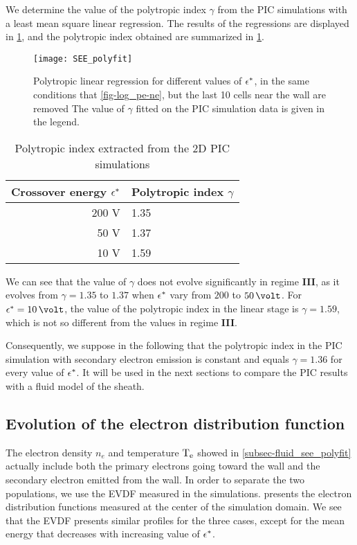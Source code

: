 We determine the value of the polytropic index $\gamma$ from the \ac{PIC} simulations with a least mean square linear regression.
The results of the regressions are displayed in \cref{fig-polyfit_see}, and the polytropic index obtained are summarized in \cref{tab-summarygamma}.


\begin{figure}[!htb]
  \centering
  \texttt{[image: SEE\_polyfit]}
  \caption{Polytropic linear regression for different values of $\epsilon^{*}$, in the same conditions that \cref{fig-log_pe-ne}, but the last 10 cells near the wall are removed The value of $\gamma$ fitted on the \acs{PIC} simulation data is given in the legend.}
  \label{fig-polyfit_see}
\end{figure}

\begin{table}[!htb]
  \centering
  \caption{Polytropic index extracted from the \acs{2D}  \acs{PIC} simulations}
  \label{tab-summarygamma}
  \begin{tabular}{@{}r l@{}} \toprule
  Crossover energy $\epsilon^{*}$ & Polytropic index $\gamma$ \\ \midrule
  200 V & 1.35 \\
  50 V & 1.37 \\
  10 V & 1.59 \\
  \bottomrule
  \end{tabular}
\end{table}


We can see that the value of $\gamma$ does not evolve significantly in regime {\bf III}, as it evolves from $\gamma=1.35$  to $1.37$ when $\epsilon^{*}$ vary from $200$ to $50\,\volt$.
For $\crover=10\,\volt$, the value of the polytropic index in the linear stage is $\gamma=1.59$, which is not so different from the values in regime {\bf III}.

Consequently, we suppose in the following that the polytropic index in the \ac{PIC} simulation with secondary electron emission is constant and equals $\gamma=1.36$ for every value of $\epsilon^{*}$.
It will be used in the next sections to compare the \ac{PIC} results with a fluid model of the sheath.



\subsection{Evolution of the electron distribution function} \label{subsec-EVDF_see_polyfit}

The electron density $n_e$ and  temperature $\mathrm{T_e}$ showed in \cref{subsec-fluid_see_polyfit} actually include both the primary electrons going toward the wall and the secondary electron emitted from the wall.
In order to separate the two populations, we use the \ac{EVDF} measured in the simulations.
 presents the electron distribution functions measured at the center of the simulation domain. 
We see that the \ac{EVDF} presents similar profiles for the three cases, except for the mean energy that decreases with increasing value of $\epsilon^{*}$.

